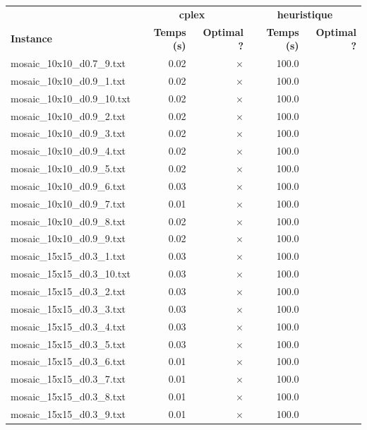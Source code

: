 \documentclass{article}
\begin{document}
\newpage
\begin{center}
\renewcommand{\arraystretch}{1.4} 
 \begin{tabular}{lrrrr}
	\hline
 & \multicolumn{2}{c}{\textbf{cplex}} & \multicolumn{2}{c}{\textbf{heuristique}}\\
\textbf{Instance}  & \textbf{Temps (s)} & \textbf{Optimal ?}  & \textbf{Temps (s)} & \textbf{Optimal ?} \\\hline

mosaic\_10x10\_d0.7\_9.txt & 0.02 & 
$\times$
 & 100.0 & 
\\
mosaic\_10x10\_d0.9\_1.txt & 0.02 & 
$\times$
 & 100.0 & 
\\
mosaic\_10x10\_d0.9\_10.txt & 0.02 & 
$\times$
 & 100.0 & 
\\
mosaic\_10x10\_d0.9\_2.txt & 0.02 & 
$\times$
 & 100.0 & 
\\
mosaic\_10x10\_d0.9\_3.txt & 0.02 & 
$\times$
 & 100.0 & 
\\
mosaic\_10x10\_d0.9\_4.txt & 0.02 & 
$\times$
 & 100.0 & 
\\
mosaic\_10x10\_d0.9\_5.txt & 0.02 & 
$\times$
 & 100.0 & 
\\
mosaic\_10x10\_d0.9\_6.txt & 0.03 & 
$\times$
 & 100.0 & 
\\
mosaic\_10x10\_d0.9\_7.txt & 0.01 & 
$\times$
 & 100.0 & 
\\
mosaic\_10x10\_d0.9\_8.txt & 0.02 & 
$\times$
 & 100.0 & 
\\
mosaic\_10x10\_d0.9\_9.txt & 0.02 & 
$\times$
 & 100.0 & 
\\
mosaic\_15x15\_d0.3\_1.txt & 0.03 & 
$\times$
 & 100.0 & 
\\
mosaic\_15x15\_d0.3\_10.txt & 0.03 & 
$\times$
 & 100.0 & 
\\
mosaic\_15x15\_d0.3\_2.txt & 0.03 & 
$\times$
 & 100.0 & 
\\
mosaic\_15x15\_d0.3\_3.txt & 0.03 & 
$\times$
 & 100.0 & 
\\
mosaic\_15x15\_d0.3\_4.txt & 0.03 & 
$\times$
 & 100.0 & 
\\
mosaic\_15x15\_d0.3\_5.txt & 0.03 & 
$\times$
 & 100.0 & 
\\
mosaic\_15x15\_d0.3\_6.txt & 0.01 & 
$\times$
 & 100.0 & 
\\
mosaic\_15x15\_d0.3\_7.txt & 0.01 & 
$\times$
 & 100.0 & 
\\
mosaic\_15x15\_d0.3\_8.txt & 0.01 & 
$\times$
 & 100.0 & 
\\
mosaic\_15x15\_d0.3\_9.txt & 0.01 & 
$\times$
 & 100.0 & 
\\

\end{tabular}
\end{center}
\end{document}
